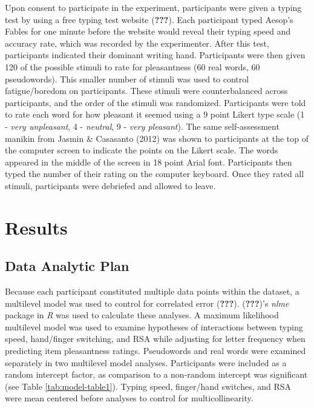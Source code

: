 \documentclass[english,man]{apa6}
\theoremstyle{definition}
\theoremstyle{definition}
\theoremstyle{definition}
\theoremstyle{remark}
\begin{document}
Upon consent to participate in the experiment, participants were given a
typing test by using a free typing test website ({\textbf{???}}). Each
participant typed Aesop's Fables for one minute before the website would
reveal their typing speed and accuracy rate, which was recorded by the
experimenter. After this test, participants indicated their dominant
writing hand. Participants were then given 120 of the possible stimuli
to rate for pleasantness (60 real words, 60 pseudowords). This smaller
number of stimuli was used to control fatigue/boredom on participants.
These stimuli were counterbalanced across participants, and the order of
the stimuli was randomized. Participants were told to rate each word for
how pleasant it seemed using a 9 point Likert type scale (1 - \emph{very
unpleasant}, 4 - \emph{neutral}, 9 - \emph{very pleasant}). The same
self-assessment manikin from Jasmin \& Casasanto (2012) was shown to
participants at the top of the computer screen to indicate the points on
the Likert scale. The words appeared in the middle of the screen in 18
point Arial font. Participants then typed the number of their rating on
the computer keyboard. Once they rated all stimuli, participants were
debriefed and allowed to leave.

\section{Results}\label{results}

\subsection{Data Analytic Plan}\label{data-analytic-plan}

Because each participant constituted multiple data points within the
dataset, a multilevel model was used to control for correlated error
({\textbf{???}}). ({\textbf{???}})'s \emph{nlme} package in \emph{R} was
used to calculate these analyses. A maximum likelihood multilevel model
was used to examine hypotheses of interactions between typing speed,
hand/finger switching, and RSA while adjusting for letter frequency when
predicting item pleasantness ratings. Pseudowords and real words were
examined separately in two multilevel model analyses. Participants were
included as a random intercept factor, as comparison to a non-random
intercept was significant (see Table \ref{tab:model-table1}). Typing
speed, finger/hand switches, and RSA were mean centered before analyses
to control for multicollinearity.
\end{document}
